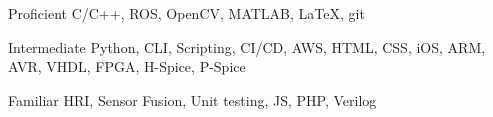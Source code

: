 

\begin{cvskills}

  \cvskill
    {Proficient} %
    {C/C++, ROS, OpenCV, MATLAB, LaTeX, git} %

  \cvskill
    {Intermediate} %
    {Python, CLI, Scripting, CI/CD, AWS, HTML, CSS, iOS, ARM, AVR, VHDL, FPGA, H-Spice, P-Spice} %

  \cvskill
    {Familiar} %
    {HRI, Sensor Fusion, Unit testing, JS, PHP, Verilog} %

\end{cvskills}
